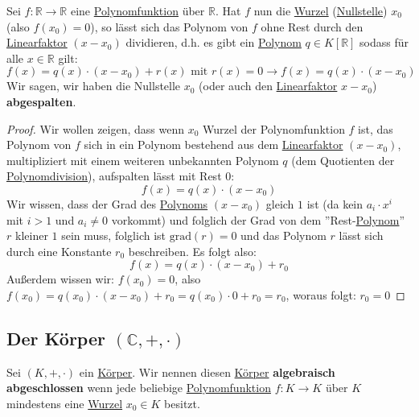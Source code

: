 \documentclass[../../main.tex]{subfiles}
\begin{document}
		\begin{theorem}
			\label{satz:AbspaltenEinerNullstelle}
			Sei $f:\mathbb{R}\rightarrow \mathbb{R}$ eine \hyperref[def:Polynomfunktion]{Polynomfunktion} über $\mathbb{R}$. Hat $f$ nun die \hyperref[def:Wurzel]{Wurzel} (\hyperref[def:Nullstelle]{Nullstelle}) $x_0$ (also $f(x_0)=0$), so lässt sich das Polynom von $f$ ohne Rest durch den \hyperref[def:Linearfaktor]{Linearfaktor} $(x-x_0)$ dividieren, d.h. es gibt ein \hyperref[def:Polynom]{Polynom} $q \in K[\mathbb{R}]$ sodass für alle $x\in \mathbb{R}$ gilt: $$f(x)=q(x)\cdot(x-x_0)+r(x) \textrm{ mit } r(x)=0 \rightarrow f(x)=q(x)\cdot(x-x_0)$$
			Wir sagen, wir haben die Nullstelle $x_0$ (oder auch den \hyperref[def:Linearfaktor]{Linearfaktor} $x-x_0$) \textbf{abgespalten}.
			
			\begin{proof}
				Wir wollen zeigen, dass wenn $x_0$ Wurzel der Polynomfunktion $f$ ist, das Polynom von $f$ sich in ein Polynom bestehend aus dem \hyperref[def:Linearfaktor]{Linearfaktor} $(x-x_0)$, multipliziert mit einem weiteren unbekannten Polynom $q$ (dem Quotienten der \hyperref[def:Polynomdivision]{Polynomdivision}), aufspalten lässt mit Rest 0: $$f(x)=q(x)\cdot(x-x_0)$$
				Wir wissen, dass der Grad des \hyperref[def:Polynom]{Polynoms} $(x-x_0)$ gleich $1$ ist (da kein $a_i \cdot x^i$ mit $i>1$ und $a_i\not =0$ vorkommt) und folglich der Grad von dem ''Rest-\hyperref[def:Polynom]{Polynom}'' $r$ kleiner $1$ sein muss, folglich ist $\textrm{grad}(r)=0$ und das Polynom $r$ lässt sich durch eine Konstante $r_0$ beschreiben. Es folgt also: $$f(x)=q(x) \cdot (x-x_0) + r_0$$
				Außerdem wissen wir: $f(x_0) = 0$, also $f(x_0)=q(x_0)\cdot(x-x_0)+r_0=q(x_0)\cdot 0 + r_0 = r_0$, woraus folgt: $r_0=0$
			\end{proof}
		\end{theorem}
	
	
		\subsection{Der Körper $(\mathbb{C},+,\cdot)$}
		
		\begin{definition}
			\label{def:algebraischAbgeschlossen}
			Sei $(K, +, \cdot)$ ein \hyperref[def:Körper]{Körper}. Wir nennen diesen \hyperref[def:Körper]{Körper} \textbf{algebraisch abgeschlossen} wenn jede beliebige \hyperref[def:Polynomfunktion]{Polynomfunktion} $f: K \rightarrow K$ über $K$ mindestens eine \hyperref[def:Wurzel]{Wurzel} $x_0 \in K$ besitzt. 
		\end{definition}
	
\end{document}
